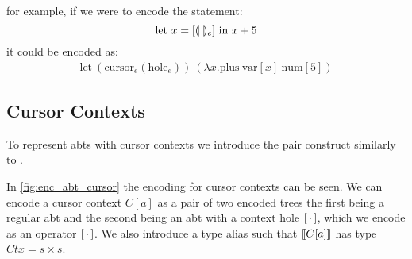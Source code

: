 \documentclass[sigplan,anonymous,review]{acmart}
\begin{document}
for example, if we were to encode the statement:
\begin{equation*}
        \text{let $x=[\llparenthesis \ \rrparenthesis_e]$ in $x+5$}
    \end{equation*}
    it could be encoded as:
    \begin{align*} 
        \text{let} \ (\text{cursor}_e(\text{hole}_e)) \ (\lambda x . \text{plus} \ \text{var}[x] \ \text{num}[5])
  \end{align*}




\subsection{Cursor Contexts}\label{sec:enc_cursor_contexts}

To represent abts with cursor contexts we introduce the pair construct similarly to \cite{types_programming_languages}.


In \cref{fig:enc_abt_cursor} the encoding for cursor contexts can be seen. We can encode a cursor context $C[a]$ as a pair of two encoded trees the first being a regular abt and the second being an abt with a context hole $[ \, \cdot \, ]$, which we encode as an operator $[ \, \cdot \, ]$. We also introduce a type alias such that $\llbracket C[a] \rrbracket$ has type $Ctx = s \times s$.
\end{document}
